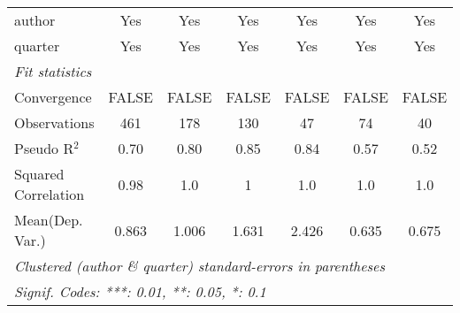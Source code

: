 \begin{tabular}{lcccccc}
   author                                                     & Yes          & Yes                      & Yes            & Yes     & Yes           & Yes\\  
   quarter                                                    & Yes          & Yes                      & Yes            & Yes     & Yes           & Yes\\  
   \midrule
   \emph{Fit statistics}\\
   Convergence                                                &FALSE         & FALSE                    & FALSE          & FALSE   & FALSE         & FALSE\\  
   Observations                                               & 461          & 178                      & 130            & 47      & 74            & 40\\  
   Pseudo R$^2$                                               & 0.70         & 0.80                     & 0.85           & 0.84    & 0.57          & 0.52\\  
   Squared Correlation                                        & 0.98         & 1.0                      & 1              & 1.0     & 1.0           & 1.0\\  
Mean(Dep. Var.) & 0.863 & 1.006 & 1.631 & 2.426 & 0.635 & 0.675 \\
   \midrule \midrule
   \multicolumn{7}{l}{\emph{Clustered (author \& quarter) standard-errors in parentheses}}\\
   \multicolumn{7}{l}{\emph{Signif. Codes: ***: 0.01, **: 0.05, *: 0.1}}\\
\end{tabular}
\par\endgroup
